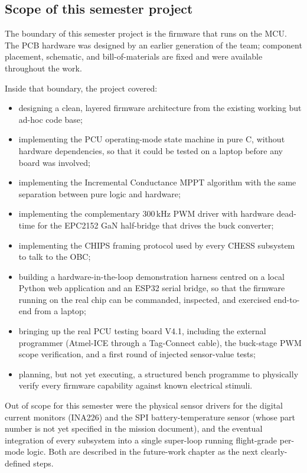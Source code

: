 \subsection{Scope of this semester project}

The boundary of this semester project is the firmware that runs on
the MCU. The PCB hardware was designed by an earlier generation of
the team; component placement, schematic, and bill-of-materials are
fixed and were available throughout the work.

Inside that boundary, the project covered:

\begin{itemize}
\item designing a clean, layered firmware architecture from the
existing working but ad-hoc code base;
\item implementing the PCU operating-mode state machine in pure C,
without hardware dependencies, so that it could be tested on a
laptop before any board was involved;
\item implementing the Incremental Conductance MPPT algorithm with
the same separation between pure logic and hardware;
\item implementing the complementary 300\,kHz PWM driver with
hardware dead-time for the EPC2152 GaN half-bridge that drives the
buck converter;
\item implementing the CHIPS framing protocol used by every CHESS
subsystem to talk to the OBC;
\item building a hardware-in-the-loop demonstration harness centred
on a local Python web application and an ESP32 serial bridge, so
that the firmware running on the real chip can be commanded,
inspected, and exercised end-to-end from a laptop;
\item bringing up the real PCU testing board V4.1, including the
external programmer (Atmel-ICE through a Tag-Connect cable), the
buck-stage PWM scope verification, and a first round of injected
sensor-value tests;
\item planning, but not yet executing, a structured bench programme
to physically verify every firmware capability against known
electrical stimuli.
\end{itemize}

Out of scope for this semester were the physical sensor drivers for
the digital current monitors (INA226) and the SPI battery-temperature
sensor (whose part number is not yet specified in the mission
document), and the eventual integration of every subsystem into a
single super-loop running flight-grade per-mode logic. Both are
described in the future-work chapter as the next clearly-defined
steps.

